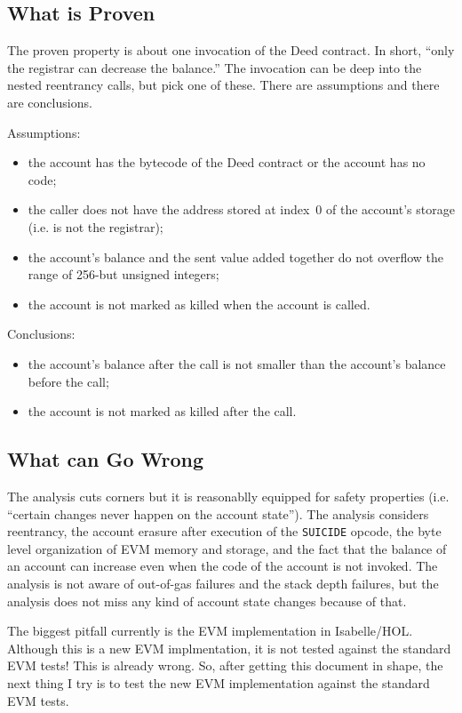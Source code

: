 \documentclass[11pt,a4paper]{article}
\begin{document}
\subsection{What is Proven}

The proven property is about one invocation of the Deed contract.
In short, ``only the registrar can decrease the balance.''
The invocation can be deep into the nested reentrancy calls, but pick
one of these.
There are assumptions and there are conclusions.

Assumptions:
\begin{itemize}
  \item the account has the bytecode of the Deed contract or the
    account has no code;
  \item the caller does not have the address stored at index~0 of the
    account's storage (i.e. is not the registrar);
  \item the account's balance and the sent value added together do not
    overflow the range of 256-but unsigned integers;
  \item the account is not marked as killed when the account is called.
\end{itemize}

Conclusions:
\begin{itemize}
  \item the account's balance after the call is not smaller than the
    account's balance before the call;
  \item the account is not marked as killed after the call.
\end{itemize}


\subsection{What can Go Wrong}

The analysis cuts corners but it is reasonablly equipped for safety
properties (i.e. ``certain changes never happen on the account
state'').  The analysis considers reentrancy, the account erasure after execution
of the \texttt{SUICIDE} opcode, the byte level organization of EVM
memory and storage, and the fact that the balance of an account can
increase even when the code of the account is not invoked.
The analysis is not aware of out-of-gas failures and the stack depth
failures, but the analysis does not miss any kind of account state
changes because of that.

The biggest pitfall currently is the EVM implementation in
Isabelle/HOL.  Although this is a new EVM implmentation, it is not
tested against the standard EVM tests!  This is already wrong.
So, after getting this document in shape, the next thing I try is to
test the new EVM implementation against the standard EVM tests.
\end{document}

